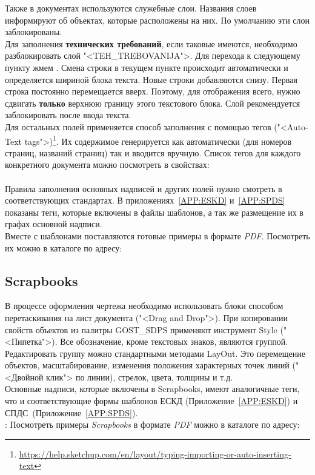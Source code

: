 \documentclass[14pt]{extreport}
\begin{document}
	Также в документах используются служебные слои. Названия слоев информируют об объектах, которые расположены на них. По умолчанию эти слои заблокированы.\\
	Для заполнения \textbf{технических требований}, если таковые имеются, необходимо разблокировать слой "<\textsf{TEH\_TREBOVANIJA}">. Для перехода к следующему пункту жмем \keys{\enter}. Смена строки в текущем пункте происходит автоматически и определяется шириной блока текста.
	Новые строки добавляются снизу. Первая  строка постоянно перемещается вверх.  Поэтому, для отображения всего, нужно сдвигать \textbf{только} верхнюю границу этого текстового блока. Слой рекомендуется заблокировать после ввода текста.\\

	Для остальных полей применяется способ заполнения с помощью тегов ("<Auto-Text tags">)\footnote{\href{https://help.sketchup.com/en/layout/typing-importing-or-auto-inserting-text}{\uline{https://help.sketchup.com/en/layout/typing-importing-or-auto-inserting-text}}}. Их содержимое генерируется как автоматически (для номеров страниц, названий страниц) так и вводится вручную. Список тегов для каждого конкретного документа можно посмотреть в свойствах:\\

	\noindent
	\\

	Правила заполнения основных надписей и других полей нужно смотреть в соответствующих стандартах. В приложениях~\ref{APP:ESKD} и~\ref{APP:SPDS} показаны теги, которые включены в файлы шаблонов, а так же размещение их в графах основной надписи.\\

	Вместе с шаблонами поставляются готовые примеры в формате \emph{PDF}. Посмотреть их можно в каталоге по адресу:\\

	\noindent
	{\small {}}

	\subsection{Scrapbooks}
	В процессе оформления чертежа необходимо использовать блоки способом перетаскивания на лист документа ("<Drag and Drop">). При копировании свойств объектов из палитры \textsf{GOST\_SDPS} применяют инструмент \textsf{Style} ("<Пипетка">).
	Все обозначение, кроме текстовых знаков, являются группой. Редактировать группу можно стандартными методами LayOut. Это перемещение объектов, масштабирование, изменения положения характерных точек линий ("<Двойной клик"> по линии), стрелок, цвета, толщины и т.д.\\
	Основные надписи, которые включены в Scrapbooks, имеют аналогичные теги, что и соответствующие формы шаблонов ЕСКД (Приложение~\ref{APP:ESKD}) и СПДС~(Приложение~\ref{APP:SPDS}).\\
	:
	Посмотреть примеры \textit{Scrapbooks} в формате \emph{PDF} можно в каталоге по адресу:\\
\end{document}
